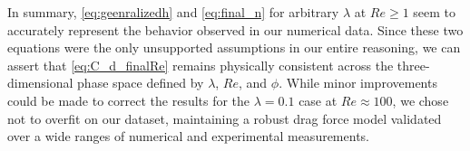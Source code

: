 In summary, \ref{eq:geenralizedh} and \ref{eq:final_n} for arbitrary $\lambda$ at $Re \ge 1$ seem to accurately represent the behavior observed in our numerical data. 
Since these two equations were the only unsupported assumptions in our entire reasoning, we can assert that \ref{eq:C_d_finalRe} remains physically consistent across the three-dimensional phase space defined by $\lambda$, $Re$, and $\phi$.
While minor improvements could be made to correct the results for the $\lambda = 0.1$ case at  $Re\approx 100$, we chose not to overfit on our dataset, maintaining a robust drag force model validated over a wide ranges of numerical and experimental measurements.